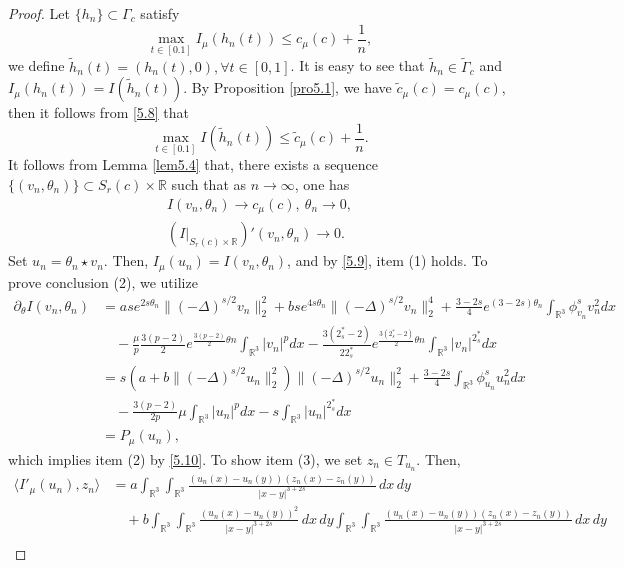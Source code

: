 \begin{proof}
Let $\{h_n\}\subset \Gamma_c$ satisfy 
\begin{equation}\label{5.8}
\max_{t\in[0.1]}I_\mu(h_n(t))\leq {c}_\mu(c)+\frac{1}{n},
\end{equation}
we define $\tilde{h}_n(t)=(h_n(t) , 0), \forall t\in[0,1]$. 
It is easy to see that $\tilde{h}_n \in \tilde{\Gamma}_c$ and 
$I_\mu(h_n(t))=I(\tilde{h}_n(t))$. By Proposition \ref{pro5.1}, we have 
$\tilde{c}_\mu(c)={c}_\mu(c)$, then it follows from \eqref{5.8} that
\[  %
\max_{t\in[0.1]}I(\tilde{h}_n(t))\leq \tilde{c}_\mu(c)+\frac{1}{n}.
\]
It follows from Lemma \ref{lem5.4} that, there exists a sequence
$\{(v_n, \theta_n)\} \subset S_{r}(c)\times \mathbb{R}$ such that as $n\to \infty$,
one has
\begin{gather}\label{5.9}
I(v_n, \theta_n)\to c_\mu(c), ~\theta_n\to 0, \\
\label{5.10}
(I|_{S_{r}(c)\times{\mathbb{R}}})'(v_n, \theta_n)\to 0.
\end{gather}
Set $u_n=\theta_n \star  v_n$. Then, $I_\mu(u_n)=I(v_n, \theta_n)$,
and by \eqref{5.9}, item (1) holds.  To prove conclusion (2), we utilize
\begin{align*}%
\partial_\theta I(v_n, \theta_n)
&= ase^{2s\theta_n}\|(-\Delta)^{s/2}v_n\|^2_2+bse^{4s\theta_n}\|(-\Delta)^{s/2}v_n\|^4_2+\frac{3-2s}{4}e^{(3-2s)\theta_n}
\int_{\mathbb{R}^3}\phi^s_{v_n}{v^2_n}dx\\
&\quad -\frac{\mu}{p}\frac{3(p-2)}{2}e^{\frac{3(p-2)}{2}\theta n}\int_{\mathbb{R}^3}|v_n|^pdx-\frac{3(2^*_s-2)}{2 2^*_s}e^{\frac{3(2^*_s-2)}{2}\theta n}\int_{\mathbb{R}^3}|v_n|^{2^*_s}dx\\
&= s(a+b\|(-\Delta)^{s/2}u_n\|^2_2)\|(-\Delta)^{s/2}u_n\|^2_2+\frac{3-2s}{4}\int_{\mathbb{R}^3}\phi^s_{u_n}{u^2_n}dx\\
&\quad -\frac{3(p-2)}{2p}\mu \int_{\mathbb{R}^3}|u_n|^pdx-s\int_{\mathbb{R}^3}|u_n|^{2^*_s}dx\\
&= P_\mu(u_n),
\end{align*}
which implies item (2) by \eqref{5.10}. To show item (3), we set $z_n\in T_{u_n}$.
Then,
\begin{align*}%
\langle I'_\mu(u_n),z_n\rangle
&= a\int_{\mathbb{R}^3}\int_{\mathbb{R}^3}
 \frac{(u_n(x)-u_n(y))(z_n(x)-z_n(y))}{|x-y|^{3+2s}}\,dx\,dy\\
&\quad +b\int_{\mathbb{R}^3}\int_{\mathbb{R}^3}\frac{(u_n(x)
 -u_n(y))^2}{|x-y|^{3+2s}}\,dx\,dy
 \int_{\mathbb{R}^3}\int_{\mathbb{R}^3}
 \frac{(u_n(x)-u_n(y))(z_n(x)-z_n(y))}{|x-y|^{3+2s}}\,dx\,dy  \\

\end{align*}
\end{proof}
